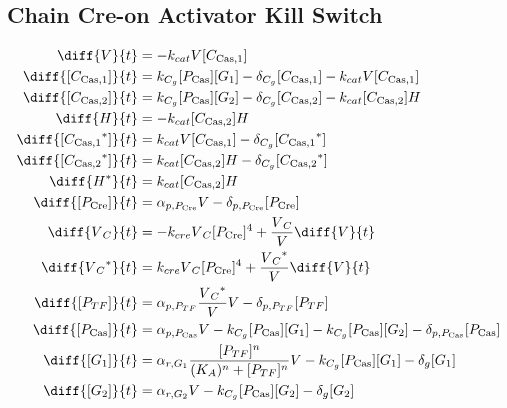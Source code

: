 \subsection{Chain Cre-on Activator Kill Switch}
\label{s:Chain_Cre_on_Activator_Kill_Switch}

\begin{align}
\diff{\vectorGen{}}{t} & = - \casCutRate{{}}\vectorGen{}\conc{\cplx{\cas}{1}}\\
\diff{\conc{\cplx{\cas}{1}}}{t} & =  \gRnaBind{}\conc{\proSp{\cas{}}}\conc{\gRna{1}} - \casCompDegradeRate{}\conc{\cplx{\cas}{1}} - \casCutRate{{}}\vectorGen{}\conc{\cplx{\cas}{1}}\\
\diff{\conc{\cplx{\cas}{2}}}{t} & =  \gRnaBind{}\conc{\proSp{\cas{}}}\conc{\gRna{2}} - \casCompDegradeRate{}\conc{\cplx{\cas}{2}} - \casCutRate{{}}\conc{\cplx{\cas}{2}}\hostGen{}\\
\diff{\hostGen{}}{t} & = - \casCutRate{{}}\conc{\cplx{\cas}{2}}\hostGen{}\\
\diff{\conc{\bound{\cplx{\cas}{1}}}}{t} & =  \casCutRate{{}}\vectorGen{}\conc{\cplx{\cas}{1}} - \casCompDegradeRate{}\conc{\bound{\cplx{\cas}{1}}}\\
\diff{\conc{\bound{\cplx{\cas}{2}}}}{t} & =  \casCutRate{{}}\conc{\cplx{\cas}{2}}\hostGen{} - \casCompDegradeRate{}\conc{\bound{\cplx{\cas}{2}}}\\
\diff{\edited{\hostGen{}}}{t} & =  \casCutRate{{}}\conc{\cplx{\cas}{2}}\hostGen{}\\
\diff{\conc{\proSp{\cre{}}}}{t} & =  \txtlRate{\proSp{\cre{}}}\vectorGen{} - \proDegradeRate{\proSp{\cre{}}}\conc{\proSp{\cre{}}}\\
\diff{\vectorGen{}_C}{t} & = - \creCutRate{} \vectorGen{}_C \conc{\proSp{\cre{}}}^4 + \frac{\vectorGen{}_C}{\vectorGen{}} \diff{\vectorGen{}}{t}\\
\diff{\edited{\vectorGen{}_C}}{t} & =  \creCutRate{} \vectorGen{}_C \conc{\proSp{\cre{}}}^4 + \frac{\edited{\vectorGen{}_C}}{\vectorGen{}} \diff{\vectorGen{}}{t}\\
\diff{\conc{\proSp{TF}}}{t} & =  \txtlRate{\proSp{TF}}\frac{\edited{\vectorGen{}_C}}{\vectorGen{}}\vectorGen{} - \proDegradeRate{\proSp{TF}}\conc{\proSp{TF}}\\
\diff{\conc{\proSp{\cas{}}}}{t} & =  \txtlRate{\proSp{\cas{}}}\vectorGen{} - \gRnaBind{}\conc{\proSp{\cas{}}}\conc{\gRna{1}} - \gRnaBind{}\conc{\proSp{\cas{}}}\conc{\gRna{2}} - \proDegradeRate{\proSp{\cas{}}}\conc{\proSp{\cas{}}}\\
\diff{\conc{\gRna{1}}}{t} & =  \txRate{\gRna{1}}\frac{\conc{\proSp{TF}}^n}{(K_A)^n + \conc{\proSp{TF}}^n}\vectorGen{} - \gRnaBind{}\conc{\proSp{\cas{}}}\conc{\gRna{1}} - \rnaDegradeRate{}\conc{\gRna{1}}\\
\diff{\conc{\gRna{2}}}{t} & =  \txRate{\gRna{2}}\vectorGen{} - \gRnaBind{}\conc{\proSp{\cas{}}}\conc{\gRna{2}} - \rnaDegradeRate{}\conc{\gRna{2}}
\end{align}

